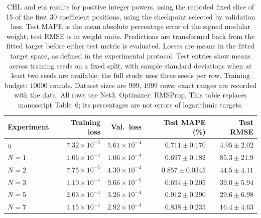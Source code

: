 \begin{table}[!htbp]
\centering
\small
\setlength{\tabcolsep}{4pt}
\renewcommand{\arraystretch}{1.18}
\begin{tabular}{@{}lrrrr@{}}
\toprule
Experiment & Training loss & Val.\ loss & Test MAPE (\%) & Test RMSE \\
\midrule
$\eta$ & $7.32\times10^{-5}$ & $5.61\times10^{-4}$ & $0.711\pm0.170$ & $4.95\pm2.02$ \\
$N=1$ & $1.06\times10^{-4}$ & $1.06\times10^{-4}$ & $0.697\pm0.182$ & $85.3\pm21.9$ \\
$N=2$ & $7.75\times10^{-5}$ & $4.30\times10^{-4}$ & $0.857\pm0.0345$ & $44.5\pm4.11$ \\
$N=3$ & $1.10\times10^{-4}$ & $9.66\times10^{-5}$ & $0.694\pm0.205$ & $39.0\pm5.94$ \\
$N=5$ & $2.03\times10^{-4}$ & $3.26\times10^{-4}$ & $0.912\pm0.290$ & $29.6\pm6.98$ \\
$N=7$ & $1.15\times10^{-4}$ & $2.92\times10^{-4}$ & $0.838\pm0.235$ & $16.4\pm4.63$ \\
\bottomrule
\end{tabular}
\caption{\textsf{CHL and eta results for positive integer powers, using the recorded fixed slice of 15 of the first 30 coefficient positions, using the checkpoint selected by validation loss. Test MAPE is the mean absolute percentage error of the signed modular weight; test RMSE is in weight units. Predictions are transformed back from the fitted target before either test metric is evaluated. Losses are means in the fitted target space, as defined in the experimental protocol. Test entries show means across training seeds on a fixed split, with sample standard deviations when at least two seeds are available; the full study uses three seeds per row. Training budget: $10000$ rounds. Dataset sizes are $999$, $1999$ rows; exact ranges are recorded with the data. All rows use Net3. Optimizer: RMSProp. This table replaces manuscript Table~6; its percentages are not errors of logarithmic targets.}}
\label{tab:chl-revised-6-best}
\end{table}
